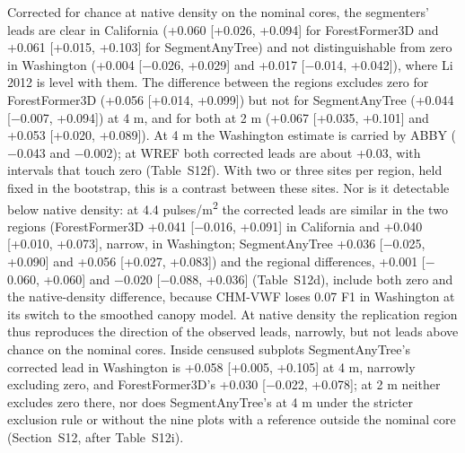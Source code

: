 \documentclass[10pt]{article}
\begin{document}
Corrected for chance at native density on the nominal cores, the segmenters'
leads are clear in California (+0.060 [+0.026, +0.094] for ForestFormer3D and
+0.061 [+0.015, +0.103] for SegmentAnyTree) and not distinguishable from zero in
Washington (+0.004 [$-$0.026, +0.029] and +0.017 [$-$0.014, +0.042]), where Li 2012
is level with them. The difference between the regions excludes zero for
ForestFormer3D (+0.056 [+0.014, +0.099]) but not for SegmentAnyTree (+0.044
[$-$0.007, +0.094]) at 4 m, and for both at 2 m (+0.067 [+0.035, +0.101] and
+0.053 [+0.020, +0.089]). At 4 m the Washington estimate is carried by ABBY
($-$0.043 and $-$0.002); at WREF both corrected leads are about +0.03, with
intervals that touch zero (Table~S12f). With two or three sites per region, held
fixed in the bootstrap, this is a contrast between these sites. Nor is it
detectable below native density: at 4.4 pulses/m\textsuperscript{2} the corrected leads are
similar in the two regions (ForestFormer3D +0.041 [$-$0.016, +0.091] in California
and +0.040 [+0.010, +0.073], narrow, in Washington; SegmentAnyTree +0.036
[$-$0.025, +0.090] and +0.056 [+0.027, +0.083]) and the regional differences,
+0.001 [$-$0.060, +0.060] and $-$0.020 [$-$0.088, +0.036] (Table~S12d), include both
zero and the native-density difference, because CHM-VWF loses 0.07 F1 in
Washington at its switch to the smoothed canopy model. At native density the
replication region thus reproduces the direction of the observed leads,
narrowly, but not leads above chance on the nominal cores. Inside censused
subplots SegmentAnyTree's corrected lead in Washington is +0.058 [+0.005,
+0.105] at 4 m, narrowly excluding zero, and ForestFormer3D's +0.030 [$-$0.022,
+0.078]; at 2 m neither excludes zero there, nor does SegmentAnyTree's at 4 m
under the stricter exclusion rule or without the nine plots with a reference
outside the nominal core (Section~S12, after Table~S12i).
\end{document}
